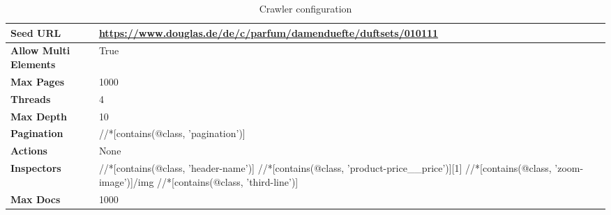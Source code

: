 {\begin{table}[ht] 
{\footnotesize
\begin{tabular}{ P{3cm} ||P{10.1cm}  }      %
 \hline \hline
\textbf{Seed URL} & \href{https://www.douglas.de/de/c/parfum/damenduefte/duftsets/010111}{https://www.douglas.de/de/c/parfum/damenduefte/duftsets/010111}\T\B 
\\ 
\hline
\textbf{Allow Multi Elements} & True \T\B 
\\ 
\hline
\textbf{Max Pages} & 1000\T\B 
\\ 
\hline
\textbf{Threads} & 4\T\B 
\\ 
\hline
\textbf{Max Depth} & 10\T\B 
\\ 
\hline
\textbf{Pagination} & //*[contains(@class, 'pagination')]\T\B 
\\ 
\hline
\textbf{Actions} & None\T\B 
\\ 
\hline
\textbf{Inspectors} & //*[contains(@class, 'header-name')]\T\B  \newline
//*[contains(@class, 'product-price\_\_price')][1] \newline
//*[contains(@class, 'zoom-image')]/img \newline
//*[contains(@class, 'third-line')] 
\\ 
\hline
\textbf{Max Docs} & 1000\T\B 
\\ 
\hline \hline
    \end{tabular}
}
  \captionsetup{justification=centering,margin=2cm}
  \caption{Crawler configuration}
\end{table}



}
